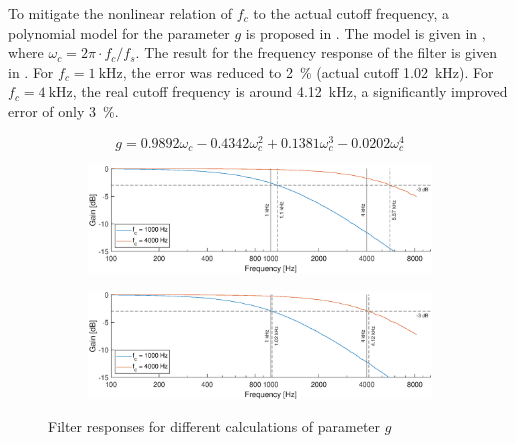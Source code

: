 \documentclass[a4paper, 12pt]{article}
\begin{document}
To mitigate the nonlinear relation of $f_c$ to the actual cutoff frequency, a polynomial model for the parameter $g$ is proposed in \cite{Vaelimaeki2006}. The model is given in , where $\omega_c = 2 \pi \cdot f_c / f_s$. The result for the frequency response of the filter is given in . For $f_c = \SI{1}{\kilo\hertz}$, the error was reduced to \SI{2}{\percent} (actual cutoff \SI{1.02}{\kilo\hertz}). For $f_c = \SI{4}{\kilo\hertz}$, the real cutoff frequency is around \SI{4.12}{\kilo\hertz}, a significantly improved error of only \SI{3}{\percent}.

\begin{equation}
	\label{eq:polynom-fit}
	g = 0.9892 \omega_c - 0.4342 \omega_c^2 + 0.1381 \omega_c^3 - 0.0202 \omega_c^4
\end{equation}

\begin{figure} [!h]
	\centering
	\begin{subfigure}[b]{0.9\textwidth}
		\centering
		\includegraphics[width=\textwidth]{primitive-responses.eps}
		\label{fig:prim-resp}
	\end{subfigure}
	\begin{subfigure}[b]{0.9\textwidth}
		\centering
		\includegraphics[width=\textwidth]{improved-responses.eps}
		\label{fig:ext-resp}
	\end{subfigure}
	\caption{Filter responses for different calculations of parameter $g$}
	\label{fig:g-resp}
\end{figure}
\end{document}
